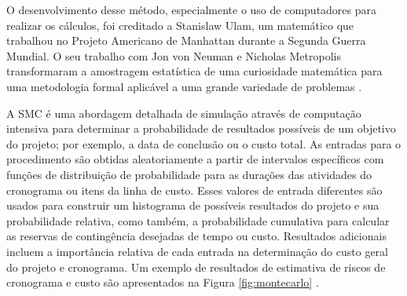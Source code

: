 O desenvolvimento desse método, especialmente o uso de computadores para realizar os cálculos, foi creditado a Stanislaw Ulam, um matemático que trabalhou no Projeto Americano de Manhattan durante a Segunda Guerra Mundial. O seu trabalho com Jon von Neuman e Nicholas Metropolis transformaram a amostragem estatística de uma curiosidade matemática para uma metodologia formal aplicável a uma grande variedade de problemas \cite{kwak2007exploring}. 

A SMC é uma abordagem detalhada de simulação através de computação intensiva para determinar a probabilidade de resultados possíveis de um objetivo do projeto; por exemplo, a data de conclusão ou o custo total. As entradas para o procedimento são obtidas aleatoriamente a partir de intervalos específicos com funções de distribuição de probabilidade para as durações das atividades do cronograma ou itens da linha de custo. Esses valores de entrada diferentes são usados para construir um histograma de possíveis resultados do projeto e sua probabilidade relativa, como também, a probabilidade cumulativa para calcular as reservas de contingência desejadas de tempo ou custo. Resultados adicionais incluem a importância relativa de cada entrada na determinação do custo geral do projeto e cronograma. Um exemplo de resultados de estimativa de riscos de cronograma e custo são apresentados na Figura \ref{fig:montecarlo} \cite{PRACTICESTANDARD2009}.

